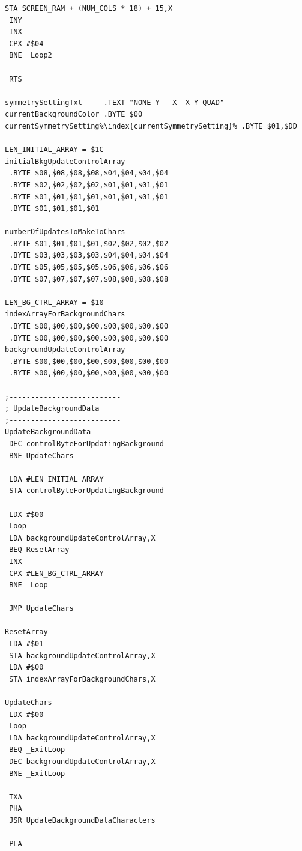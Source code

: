 \hspace{0.5cm}
\begin{minipage}[b]{0.33\linewidth}
\begin{lrbox}{\mybox}%
\begin{lstlisting}[basicstyle=\ttfamily\tiny,escapechar=\%]
 STA SCREEN_RAM + (NUM_COLS * 18) + 15,X
 INY 
 INX 
 CPX #$04
 BNE _Loop2

 RTS 

symmetrySettingTxt     .TEXT "NONE Y   X  X-Y QUAD"
currentBackgroundColor .BYTE $00
currentSymmetrySetting%\index{currentSymmetrySetting}% .BYTE $01,$DD

LEN_INITIAL_ARRAY = $1C
initialBkgUpdateControlArray   
 .BYTE $08,$08,$08,$08,$04,$04,$04,$04
 .BYTE $02,$02,$02,$02,$01,$01,$01,$01
 .BYTE $01,$01,$01,$01,$01,$01,$01,$01
 .BYTE $01,$01,$01,$01

numberOfUpdatesToMakeToChars   
 .BYTE $01,$01,$01,$01,$02,$02,$02,$02
 .BYTE $03,$03,$03,$03,$04,$04,$04,$04
 .BYTE $05,$05,$05,$05,$06,$06,$06,$06
 .BYTE $07,$07,$07,$07,$08,$08,$08,$08

LEN_BG_CTRL_ARRAY = $10
indexArrayForBackgroundChars   
 .BYTE $00,$00,$00,$00,$00,$00,$00,$00
 .BYTE $00,$00,$00,$00,$00,$00,$00,$00
backgroundUpdateControlArray   
 .BYTE $00,$00,$00,$00,$00,$00,$00,$00
 .BYTE $00,$00,$00,$00,$00,$00,$00,$00

;--------------------------
; UpdateBackgroundData
;--------------------------
UpdateBackgroundData
 DEC controlByteForUpdatingBackground
 BNE UpdateChars

 LDA #LEN_INITIAL_ARRAY
 STA controlByteForUpdatingBackground

 LDX #$00
_Loop
 LDA backgroundUpdateControlArray,X
 BEQ ResetArray
 INX 
 CPX #LEN_BG_CTRL_ARRAY
 BNE _Loop

 JMP UpdateChars

ResetArray
 LDA #$01
 STA backgroundUpdateControlArray,X
 LDA #$00
 STA indexArrayForBackgroundChars,X

UpdateChars
 LDX #$00
_Loop
 LDA backgroundUpdateControlArray,X
 BEQ _ExitLoop
 DEC backgroundUpdateControlArray,X
 BNE _ExitLoop

 TXA 
 PHA 
 JSR UpdateBackgroundDataCharacters

 PLA 
\end{lstlisting}
\end{lrbox}%
\scalebox{0.8}{\usebox{\mybox}}
\end{minipage}
\hspace{0.5cm}
